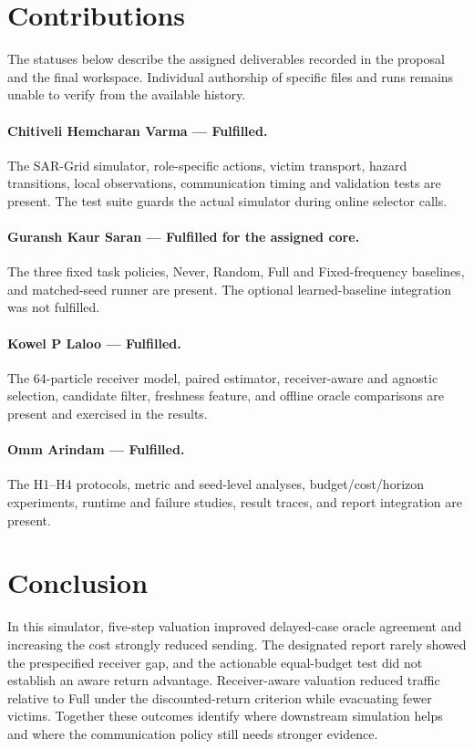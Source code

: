 \documentclass{article}
\begin{document}
\section{Contributions}

The statuses below describe the assigned deliverables recorded in the proposal and the final workspace. Individual authorship of specific files and runs remains unable to verify from the available history.

\paragraph{Chitiveli Hemcharan Varma --- Fulfilled.} The SAR-Grid simulator, role-specific actions, victim transport, hazard transitions, local observations, communication timing and validation tests are present. The test suite guards the actual simulator during online selector calls.
\paragraph{Guransh Kaur Saran --- Fulfilled for the assigned core.} The three fixed task policies, Never, Random, Full and Fixed-frequency baselines, and matched-seed runner are present. The optional learned-baseline integration was not fulfilled.
\paragraph{Kowel P Laloo --- Fulfilled.} The 64-particle receiver model, paired estimator, receiver-aware and agnostic selection, candidate filter, freshness feature, and offline oracle comparisons are present and exercised in the results.
\paragraph{Omm Arindam --- Fulfilled.} The H1--H4 protocols, metric and seed-level analyses, budget/cost/horizon experiments, runtime and failure studies, result traces, and report integration are present.

\section{Conclusion}

In this simulator, five-step valuation improved delayed-case oracle agreement and increasing the cost strongly reduced sending. The designated report rarely showed the prespecified receiver gap, and the actionable equal-budget test did not establish an aware return advantage. Receiver-aware valuation reduced traffic relative to Full under the discounted-return criterion while evacuating fewer victims. Together these outcomes identify where downstream simulation helps and where the communication policy still needs stronger evidence.



\end{document}
